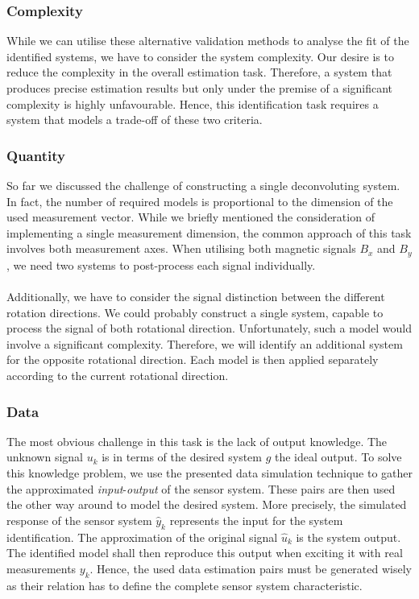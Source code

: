 \documentclass[english]{isasthesis}
\begin{document}
    	\subsubsection{Complexity}
    	While we can utilise these alternative validation methods to analyse the fit of the identified systems, we have to consider the system complexity. Our desire is to reduce the complexity in the overall estimation task. Therefore, a system that produces precise estimation results but only under the premise of a significant complexity is highly unfavourable. Hence, this identification task requires a system that models a trade-off of these two criteria.
    	\subsubsection{Quantity}
    	So far we discussed the challenge of constructing a single deconvoluting system. In fact, the number of required models is proportional to the dimension of the used measurement vector. While we briefly mentioned the consideration of implementing a single measurement dimension, the common approach of this task involves both measurement axes. When utilising both magnetic signals $B_x$ and $B_y$, we need two systems to post-process each signal individually. \\\\
    	Additionally, we have to consider the signal distinction between the different rotation directions. We could probably construct a single system, capable to process the signal of both rotational direction. Unfortunately, such a model would involve a significant complexity. Therefore, we will identify an additional system for the opposite rotational direction. Each model is then applied separately according to the current rotational direction. 
		\subsubsection{Data}
    	 The most obvious challenge in this task is the lack of output knowledge. The unknown signal $u_k$ is in terms of the desired system $g$ the ideal output. To solve this knowledge problem, we use the presented data simulation technique to gather the approximated \textit{input}-\textit{output} of the sensor system. These pairs are then used the other way around to model the desired system. More precisely, the simulated response of the sensor system $\hat{y}_k$ represents the input for the system identification. The approximation of the original signal $\hat{u}_k$ is the system output. The identified model shall then reproduce this output when exciting it with real measurements $y_k$. Hence, the used data estimation pairs must be generated wisely as their relation has to define the complete sensor system characteristic.
\end{document}
